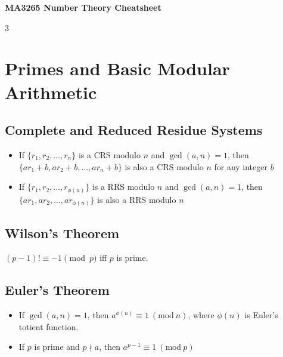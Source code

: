 \documentclass[8,a4paper]{article}
\newcommand{\Mod}[1]{\ (\mathrm{mod}\ #1)}
\begin{document}
\setlength{\columnsep}{12pt}
\setlength{\parindent}{0pt}
\setlength{\parskip}{2pt}
\setlength{\abovedisplayskip}{0pt}
\setlength{\belowdisplayskip}{0pt}
\setlength{\abovedisplayshortskip}{0pt}
\setlength{\belowdisplayshortskip}{0pt}

\begin{center}
	\Large\textbf{MA3265 Number Theory Cheatsheet}
\end{center}

\begin{multicols}{3}

	\section{Primes and Basic Modular Arithmetic}
	\subsection{Complete and Reduced Residue Systems}
	\begin{itemize}[leftmargin=*]
		\item If $\{r_1, r_2, \ldots, r_n\}$ is a CRS modulo $n$ and $\gcd(a,n) = 1$, then $\{ar_1 + b, ar_2 + b, \ldots, ar_n + b\}$ is also a CRS modulo $n$ for any integer $b$
		\item If $\{r_1, r_2, \ldots, r_{\phi(n)}\}$ is a RRS modulo $n$ and $\gcd(a,n) = 1$, then $\{ar_1, ar_2, \ldots, ar_{\phi(n)}\}$ is also a RRS modulo $n$
	\end{itemize}


	\subsection{Wilson's Theorem}
	$(p-1)! \equiv -1 \pmod{p}$ iff $p$ is prime.

	\subsection{Euler's Theorem}
	\begin{itemize}
		\item If $\gcd(a,n) = 1$, then $a^{\phi(n)} \equiv 1 \Mod{n}$, where $\phi(n)$ is Euler's totient function.
		\item If $p$ is prime and $p \nmid a$, then $a^{p-1} \equiv 1 \Mod{p}$
	\end{itemize}




\end{multicols}
\end{document}
